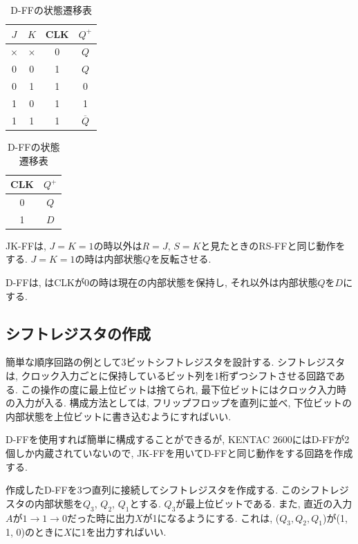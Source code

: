 \documentclass[titlepage]{jsarticle}
\begin{document}
    \begin{table}[h]
      \begin{minipage}{0.49\hsize}
        \centering
        \caption{JK-FFの状態遷移表}
        \begin{tabular}{ccc||c}
          \hline
          $J$ & $K$ & CLK & $Q^+$ \\ \hline \hline
          $\times$ & $\times$ & 0 & $Q$ \\
          0 & 0 & 1 & $Q$ \\
          0 & 1 & 1 & 0 \\
          1 & 0 & 1 & 1 \\
          1 & 1 & 1 & $\overline{Q}$ \\ \hline
        \end{tabular}
      \end{minipage}
      \begin{minipage}{0.49\hsize}
        \centering
        \caption{D-FFの状態遷移表}
        \begin{tabular}{c||c}
          \hline
          CLK & $Q^+$ \\ \hline \hline
          0 & $Q$ \\
          1 & $D$ \\ \hline
        \end{tabular}
      \end{minipage}
    \end{table}

    JK-FFは, $J = K = 1$の時以外は$R = J$, $S = K$と見たときのRS-FFと同じ動作をする.
    $J = K = 1$の時は内部状態$Q$を反転させる.

    D-FFは, はCLKが0の時は現在の内部状態を保持し, それ以外は内部状態$Q$を$D$にする.
  \subsection{シフトレジスタの作成}
    簡単な順序回路の例として3ビットシフトレジスタを設計する.
    シフトレジスタは, クロック入力ごとに保持しているビット列を1桁ずつシフトさせる回路である.
    この操作の度に最上位ビットは捨てられ, 最下位ビットにはクロック入力時の入力が入る.
    構成方法としては, フリップフロップを直列に並べ, 下位ビットの内部状態を上位ビットに書き込むようにすればいい.

    D-FFを使用すれば簡単に構成することができるが, KENTAC 2600にはD-FFが2個しか内蔵されていないので,
    JK-FFを用いてD-FFと同じ動作をする回路を作成する.

    作成したD-FFを3つ直列に接続してシフトレジスタを作成する.
    このシフトレジスタの内部状態を$Q_3$, $Q_2$, $Q_1$とする.
    $Q_3$が最上位ビットである.
    また, 直近の入力$A$が$1 \rightarrow 1 \rightarrow 0$だった時に出力$X$が1になるようにする.
    これは, ($Q_3, Q_2, Q_1$)が(1, 1, 0)のときに$X$に1を出力すればいい.
\end{document}
